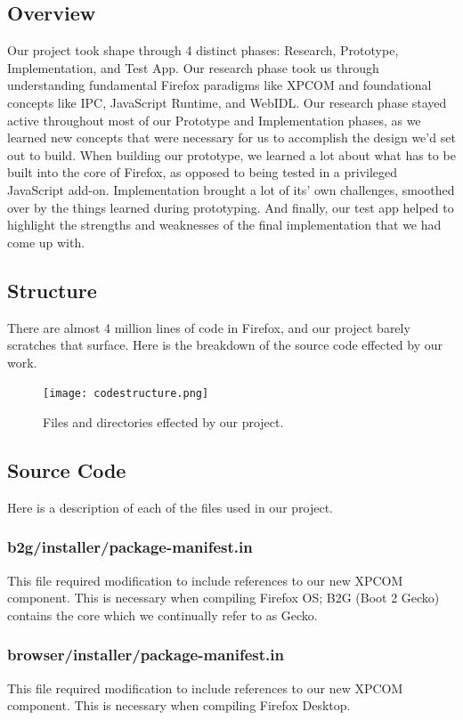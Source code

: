 \documentclass[12pt]{article}
\begin{document}
\subsection{Overview}
Our project took shape through 4 distinct phases: Research, Prototype, Implementation, and Test App. Our research phase took us through understanding fundamental Firefox paradigms like XPCOM and foundational concepts like IPC, JavaScript Runtime, and WebIDL. Our research phase stayed active throughout most of our Prototype and Implementation phases, as we learned new concepts that were necessary for us to accomplish the design we'd set out to build. When building our prototype, we learned a lot about what has to be built into the core of Firefox, as opposed to being tested in a privileged JavaScript add-on. Implementation brought a lot of its' own challenges, smoothed over by the things learned during prototyping. And finally, our test app helped to highlight the strengths and weaknesses of the final implementation that we had come up with.
\pagebreak

\subsection{Structure}
There are almost 4 million lines of code in Firefox, and our project barely scratches that surface. Here is the breakdown of the source code effected by our work.

\begin{figure}[h!]
  \centering
		\texttt{[image: codestructure.png]}
  \caption{Files and directories effected by our project.}
\end{figure}
\pagebreak

\subsection{Source Code}
Here is a description of each of the files used in our project.

\subsubsection{b2g/installer/package-manifest.in}
This file required modification to include references to our new XPCOM component. This is necessary when compiling Firefox OS; B2G (Boot 2 Gecko) contains the core which we continually refer to as Gecko.

\subsubsection{browser/installer/package-manifest.in}
This file required modification to include references to our new XPCOM component. This is necessary when compiling Firefox Desktop.
\end{document}
